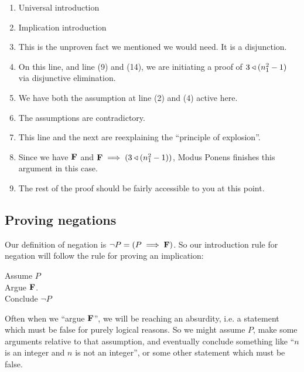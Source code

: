 \begin{example}
		\begin{enumerate}
				\item Universal introduction
				\item Implication introduction
				\item This is the unproven fact we mentioned we would need.  It is a disjunction.
				\item On this line, and line (9) and (14), we are initiating a proof of $3 \triangleleft (n_1^2 - 1)$ via disjunctive elimination.
				\item We have both the assumption at line (2) and (4) active here.
				\item The assumptions are contradictory.
				\item This line and the next are reexplaining the ``principle of explosion''.
				\item Since we have $\textbf{\textrm{F}}$ and $\textbf{\textrm{F}} \implies (3 \triangleleft (n_1^2 - 1))$,  Modus Ponens finishes this argument in this case.
				\item The rest of the proof should be fairly accessible to you at this point.
			\end{enumerate}
	\end{example}
     
\subsection{Proving negations}

Our definition of negation is $\neg P = (P \implies \textbf{\textrm{F}})$.  So our introduction rule for negation will follow the rule for proving an implication:

\begin{fitch*}
	\textrm{Assume $P$}\\
	\fa \textrm{Argue $\textbf{\textrm{F}}$.}\\
	\textrm{Conclude $\neg P$}
\end{fitch*}

Often when we ``argue $\textbf{\textrm{F}}$'', we will be reaching an \textrm{absurdity}, i.e. a statement which must be false for purely logical reasons.  So we might assume $P$, make some arguments relative to that assumption, and eventually conclude something like ``$n$ is an integer and $n$ is not an integer'', or some other statement which must be false.

